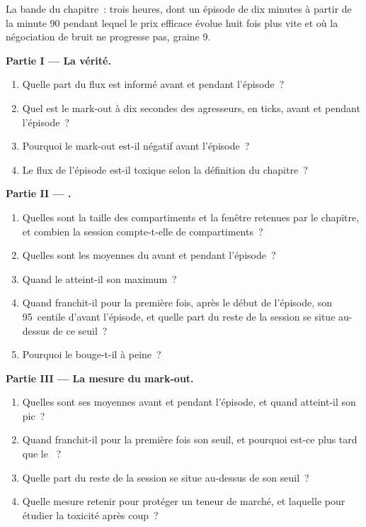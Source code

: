 \begin{problem}\label{pb:rs:trade-flow-features:1}
La bande du chapitre~: trois heures, dont un épisode de dix minutes à partir de la minute 90 pendant lequel le prix efficace évolue huit fois plus vite et où
la négociation de bruit ne progresse pas, graine 9.

\medskip\noindent\textbf{Partie I --- La vérité.}
\begin{enumerate}
\item Quelle part du flux est informé avant et pendant l'épisode~?
\item Quel est le mark-out à dix secondes des agresseurs, en ticks, avant et pendant l'épisode~?
\item Pourquoi le mark-out est-il négatif avant l'épisode~?
\item Le flux de l'épisode est-il toxique selon la définition du chapitre~?
\end{enumerate}

\medskip\noindent\textbf{Partie II --- .}
\begin{enumerate}[resume]
\item Quelles sont la taille des compartiments et la fenêtre retenues par le chapitre, et combien la session compte-t-elle de compartiments~?
\item Quelles sont les moyennes du  avant et pendant l'épisode~?
\item Quand le  atteint-il son maximum~?
\item Quand franchit-il pour la première fois, après le début de l'épisode, son 95~centile d'avant l'épisode, et quelle part du reste de la session
se situe au-dessus de ce seuil~?
\item Pourquoi le  bouge-t-il à peine~?
\end{enumerate}

\medskip\noindent\textbf{Partie III --- La mesure du mark-out.}
\begin{enumerate}[resume]
\item Quelles sont ses moyennes avant et pendant l'épisode, et quand atteint-il son pic~?
\item Quand franchit-il pour la première fois son seuil, et pourquoi est-ce plus tard que le ~?
\item Quelle part du reste de la session se situe au-dessus de son seuil~?
\item Quelle mesure retenir pour protéger un teneur de marché, et laquelle pour étudier la toxicité après coup~?
\end{enumerate}


\end{problem}
